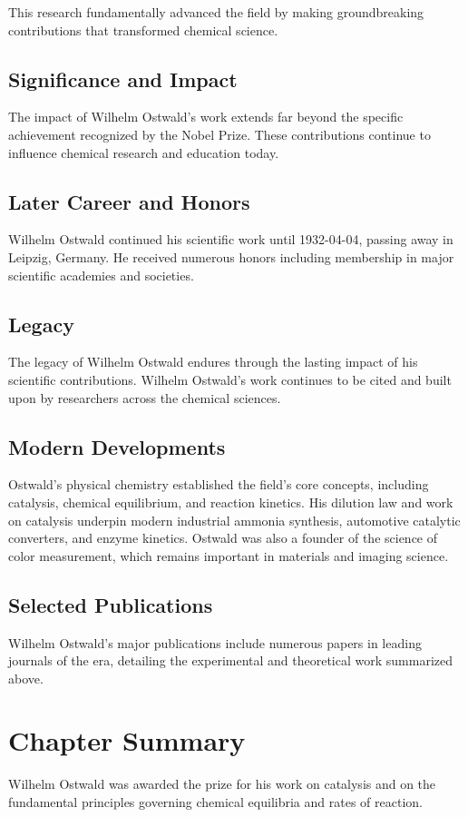 This research fundamentally advanced the field by making groundbreaking contributions that transformed chemical science.

\subsection*{Significance and Impact}

The impact of Wilhelm Ostwald's work extends far beyond the specific achievement recognized by the Nobel Prize.
These contributions continue to influence chemical research and education today.

\subsection*{Later Career and Honors}

Wilhelm Ostwald continued his scientific work until 1932-04-04, passing away in Leipzig, Germany.
He received numerous honors including membership in major scientific academies and societies.

\subsection*{Legacy}

The legacy of Wilhelm Ostwald endures through the lasting impact of his scientific contributions.
Wilhelm Ostwald's work continues to be cited and built upon by researchers across the chemical sciences.

\subsection*{Modern Developments}

Ostwald's physical chemistry established the field's core concepts, including catalysis, chemical equilibrium, and reaction kinetics. His dilution law and work on catalysis underpin modern industrial ammonia synthesis, automotive catalytic converters, and enzyme kinetics. Ostwald was also a founder of the science of color measurement, which remains important in materials and imaging science.

\subsection*{Selected Publications}

Wilhelm Ostwald's major publications include numerous papers in leading journals of the era, detailing the experimental and theoretical work summarized above.

\clearpage

\section*{Chapter Summary}

Wilhelm Ostwald was awarded the prize for his work on catalysis and on the fundamental principles governing chemical equilibria and rates of reaction.
